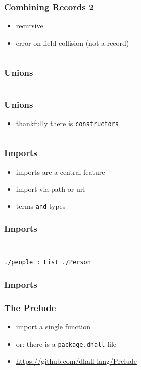 \documentclass{beamer}
\begin{document}
 \begin{frame}[fragile]
   \frametitle{Combining Records 2}
   \begin{itemize}
   \item recursive
   \item error on field collision (not a record)
   \end{itemize}
   \inputminted{text}{static-source/records-combine2.out}
 \end{frame}

 \begin{frame}
   \frametitle{Unions}
   \inputminted{text}{static-source/unions.out}
 \end{frame}

  \begin{frame}
   \frametitle{Unions}
   \begin{itemize}
   \item thankfully there is \texttt{constructors}
   \end{itemize}
   \inputminted{text}{dhall/constructors.dhall}
 \end{frame}

 \begin{frame}
   \frametitle{Imports}
   \begin{itemize}
   \item imports are a central feature
   \item import via path or url
   \item terms \texttt{and} types
   \end{itemize}
 \end{frame}

 \begin{frame}[fragile]
   \frametitle{Imports}
   \inputminted{text}{dhall/persons/people}
   \inputminted{text}{dhall/persons/Person}
   \begin{verbatim}
./people : List ./Person
   \end{verbatim}
 \end{frame}

 \begin{frame}
   \frametitle{Imports}
 \end{frame}

\begin{frame}
   \frametitle{The Prelude}
   \begin{itemize}
   \item import a single function
   \item or: there is a \texttt{package.dhall} file
   \item \url{https://github.com/dhall-lang/Prelude}
   \end{itemize}
 \end{frame}
\end{document}
